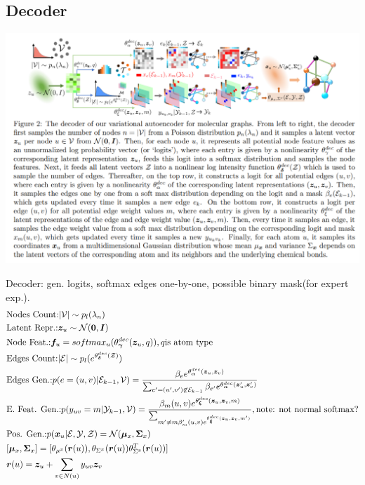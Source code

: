 \documentclass{article}
\begin{document}
    \subsection{Decoder}
    \centerline{\includegraphics[width=0.85\paperwidth]{nevae-arch.PNG}}

    Decoder: gen. logits, softmax edges one-by-one, possible binary mask(for expert exp.).
    \begin{align}
        &\text{Nodes Count:} |\mathcal{V}|\sim p_l(\lambda_n)\\
        &\text{Latent Repr.:} {\boldsymbol{z}_u}\sim \mathcal{N}(\boldsymbol{0},\boldsymbol{I})\\
        &\text{Node Feat.:} \boldsymbol{f}_u=softmax_u(\theta_{\boldsymbol{\gamma}}^{dec}(\boldsymbol{z}_u, q)),q \text{is atom type}\\
        &\text{Edges Count:} |\mathcal{E}|\sim p_l(e^{\theta_{\boldsymbol{\delta}}^{dec}(\mathcal{Z})})\\
        &\text{Edges Gen.:} p(e=(u,v)|\mathcal{E}_{k-1},\mathcal{V})=\frac{\beta_e e^{\theta^{dec}_{\boldsymbol{\alpha}}(\boldsymbol{z}_u, \boldsymbol{z}_v)}}{\sum_{e'=(u',v')\not \in \mathcal{E}_{k-1}} \beta_{e'} e^{\theta^{dec}_{\boldsymbol{\alpha}}(\boldsymbol{z}_u', \boldsymbol{z}_v')}}\\
        &\text{E. Feat. Gen.:} p(y_{uv}=m|\mathcal{Y}_{k-1},\mathcal{V})=\frac{\beta_m(u,v) e^{\theta^{dec}_{\boldsymbol{\xi}}(\boldsymbol{z}_u, \boldsymbol{z}_v, m)}}{\sum_{m'\not=m \beta_m'(u,v) e^{\theta^{dec}_{\boldsymbol{\xi}}(\boldsymbol{z}_u, \boldsymbol{z}_v, m')}}},\text{note: not normal softmax?}\\
        &\text{Pos. Gen.:} p(\boldsymbol{x}_u|\mathcal{E,Y,Z})=\mathcal N(\boldsymbol{\mu}_x, \boldsymbol{\Sigma}_x)\\
        &[\boldsymbol{\mu}_x, \boldsymbol{\Sigma}_x]=[\theta_{\mu^x}(\boldsymbol{r}(u)), \theta_{\Sigma^x}(\boldsymbol{r}(u))\theta_{\Sigma^x}^T(\boldsymbol{r}(u))]\\
        &\boldsymbol{r}(u)=\boldsymbol{z}_u+\sum_{v\in N(u)}y_{uv}\boldsymbol{z}_v
    \end{align}
\end{document}
